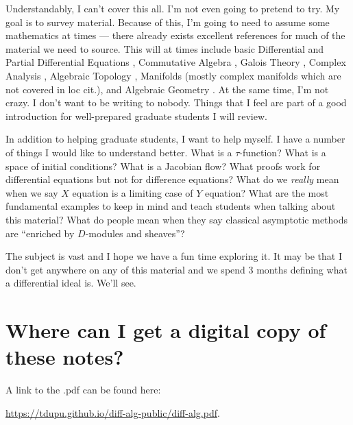 \documentclass[12pt]{book}
\numberwithin{equation}{section}
\theoremstyle{definition}
\theoremstyle{remark}
\begin{document}
Understandably, I can't cover this all. 
I'm not even going to pretend to try. 
My goal is to survey material.
Because of this, I'm going to need to assume some mathematics at times --- there already exists excellent references for much of the material we need to source.  
This will at times include basic Differential \cite{Ince1944} and Partial Differential Equations \cite{Evans2010}, Commutative Algebra \cite{Atiyah2016}, Galois Theory \cite{Cox2012}, Complex Analysis \cite{Ullrich2008}, Algebraic Topology \cite{Hatcher2002}, Manifolds \cite{Lee2013} (mostly complex manifolds which are not covered in loc cit.), and Algebraic Geometry \cite{Vakil2017}. 
At the same time, I'm not crazy. 
I don't want to be writing to nobody. 
Things that I feel are part of a good introduction for well-prepared graduate students I will review. 

In addition to helping graduate students, I want to help  myself.
I have a number of things I would like to understand better. What is a $\tau$-function? What is a space of initial conditions? 
What is a Jacobian flow? What proofs work for differential equations but not for difference equations? 
What do we \emph{really} mean when we say $X$ equation is a limiting case of $Y$ equation?
What are the most fundamental examples to keep in mind and teach students when talking about this material?
What do people mean when they say classical asymptotic methods are ``enriched by $D$-modules and sheaves''?

The subject is vast and I hope we have a fun time exploring it. 
It may be that I don't get anywhere on any of this material and we spend 3 months defining what a differential ideal is. 
We'll see. 

\iffalse
\section{A Note After Fall 2022} 
There is a manuscript by Manin \cite{Manin1978} which also attempts to unify differential algebraic and foliation theoretic perspectives on differential equations.

\fi


\section{Where can I get a digital copy of these notes?}
A link to the .pdf can be found here:
\begin{center}
	\url{https://tdupu.github.io/diff-alg-public/diff-alg.pdf}.
\end{center}
\end{document}
